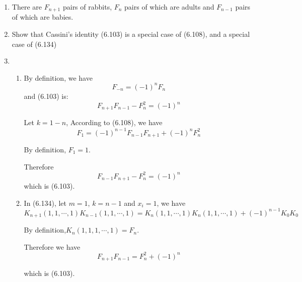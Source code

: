 \documentclass[12pt,a4paper]{article}
\makeatletter
\newtheorem*{solution}{Solution}
\theoremstyle{definition}
\renewenvironment{solution}[1][Solution] {\par\pushQED{\qed}\normalfont\topsep6\p@\@plus6\p@\relax\trivlist\item[\hskip\labelsep\bfseries#1\@addpunct{.}]\ignorespaces}{\popQED\endtrivlist\@endpefalse} \makeatother
\makeatother
\begin{document}
\begin{enumerate}
\begin{solution}
        	There are $F_{n+1}$ pairs of rabbits, $F_n$ pairs of which are adults and $F_{n-1}$ pairs of which are babies.
        	
        \end{solution}
    \item 
        Show that Cassini's identity (6.103) is a special case of (6.108), and a special case of (6.134)
        \begin{solution}
        	\ \\
        	\begin{enumerate}
        		\item 
        		    By definition, we have
        		    \begin{equation}\label{E2}
        		    F_{-n}=(-1)^nF_n
        		    \end{equation}
        		    and (6.103) is:
        		    \begin{equation}\label{E3}
        		    F_{n+1}F_{n-1}-F_n^2=(-1)^n
        		    \end{equation}
        		    
        		    Let $k=1-n$, According to (6.108), we have
        		    \begin{equation*}
        		    F_1=(-1)^{n-1}F_{n-1}F_{n+1}+(-1)^nF_n^2
        		    \end{equation*}
        		    
        		    By definition, $F_1=1$.
        		    
        		    Therefore 
        		    \begin{equation*}
        		    F_{n-1}F_{n+1}-F_n^2=(-1)^n
        		    \end{equation*}
        		    which is (6.103).
        		\item 
        		    In (6.134), let $m=1$, $k=n-1$ and $x_i=1$, we have
        		    \begin{equation*}
        		        K_{n+1}(1,1,\cdots,1)K_{n-1}(1,1,\cdots,1)=K_n(1,1,\cdots,1)K_n(1,1,\cdots,1)+(-1)^{n-1}K_0K_0
        		    \end{equation*}
        		    
        		    By definition,$K_n(1,1,1,\cdots,1)=F_n$.
        		    
        		    Therefore we have
        		    \begin{equation*}
        		        F_{n+1}F_{n-1}=F_n^2+(-1)^n
        		    \end{equation*}
        		    
        		    which is (6.103).
        	\end{enumerate}
        	

\end{solution}
\end{enumerate}
\end{document}
